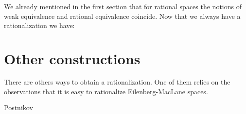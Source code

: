 We already mentioned in the first section that for rational spaces the notions of weak equivalence and rational equivalence coincide. Now that we always have a rationalization we have:



\section{Other constructions}
There are others ways to obtain a rationalization. One of them relies on the observations that it is easy to rationalize Eilenberg-MacLane spaces.


Postnikov
